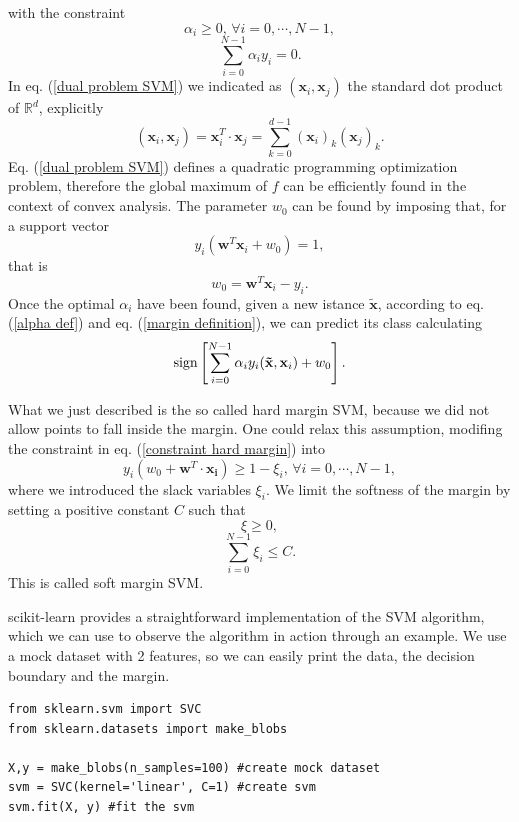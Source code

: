 \documentclass[a4paper]{article}
\begin{document}
with the constraint
\begin{equation}
    \alpha_i\geq 0,\,\forall i=0,\cdots, N-1,
\end{equation}
\begin{equation}
    \sum_{i=0}^{N-1}\alpha_iy_i=0.
\end{equation}
In eq. (\ref{dual problem SVM}) we indicated as $(\mathbf{x}_i,\mathbf{x}_j)$ the standard dot product of $\mathbb{R}^d$, explicitly
$$(\mathbf{x}_i,\mathbf{x}_j)=\mathbf{x}_i^T\cdot\mathbf{x}_j=\sum_{k=0}^{d-1}(\mathbf{x}_i)_k(\mathbf{x}_j)_k.$$
Eq. (\ref{dual problem SVM}) defines a quadratic programming
optimization problem, therefore the global maximum of $f$ can be efficiently found in the context of convex analysis. The parameter $w_0$ can be found by imposing that, for a support vector $$y_i(\mathbf{w}^T\mathbf{x}_i+w_0)=1,$$ that is 
\begin{equation}
    w_0=\mathbf{w}^T\mathbf{x}_i-y_i.
\end{equation} 
Once the optimal $\alpha_i$ have been found, given a new istance $\mathbf{\tilde{x}}$, according to eq. (\ref{alpha def}) and eq. (\ref{margin definition}), we can predict its class calculating 
\begin{equation}
    \textup{sign}\left[\sum_{i=0}^{N-1}\alpha_iy_i(\mathbf{\tilde{x}}, \mathbf{x}_i)+w_0\right].
    \label{decision boundary svm}
\end{equation} 

What we just described is the so called hard margin SVM, because we did not allow points to fall inside the margin. One could relax this assumption, modifing the constraint in eq. (\ref{constraint hard margin}) into 
\begin{equation}
    y_i(w_0+\mathbf{w}^T\cdot \mathbf{x_i})\geq 1-\xi_i, \, \forall i=0,\cdots, N-1,
\end{equation}
where we introduced the slack variables $\xi_i$. We limit the softness of the margin by setting a positive constant $C$ such that 
$$ \xi\geq0,$$
\begin{equation}
    \sum_{i=0}^{N-1}\xi_i\leq C.
\end{equation}
This is called soft margin SVM. 

scikit-learn provides a straightforward implementation of the SVM algorithm, which we can use to observe the algorithm in action through an example. We use a mock dataset with 2 features, so we can easily print the data, the decision boundary and the margin. 


\begin{lstlisting}
from sklearn.svm import SVC
from sklearn.datasets import make_blobs 

X,y = make_blobs(n_samples=100) #create mock dataset
svm = SVC(kernel='linear', C=1) #create svm
svm.fit(X, y) #fit the svm
\end{lstlisting}
\end{document}

